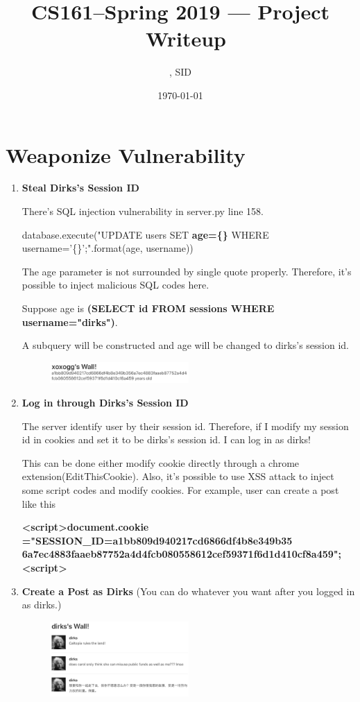 \documentclass[11pt]{article}
\title{CS161--Spring 2019 --- Project \Homework\ Writeup}
\author{\Name, SID \SID}
\date{\today}
\newenvironment{qparts}{\begin{enumerate}[{(}a{)}]}{\end{enumerate}}
\begin{document}
\maketitle

\section{Weaponize Vulnerability}
\begin{qparts}
	\item \textbf{Steal Dirks's Session ID}
	
	There's SQL injection vulnerability in server.py line 158.
	
	database.execute("UPDATE users SET \textbf{age=\{\}} WHERE username='\{\}';".format(age, username))

	The age parameter is not surrounded by single quote properly. Therefore, it's possible to inject malicious SQL codes here.
	
	Suppose age is \textbf{(SELECT id FROM sessions WHERE username="dirks")}.
	
	A subquery will be constructed and age will be changed to dirks's session id.
	
	\begin{figure}[h]
	\centering
	\includegraphics[width=0.5\textwidth]{session_id.png}
	\end{figure}
	
	\item \textbf{Log in through Dirks's Session ID}
	
	The server identify user by their session id. Therefore, if I modify my session id in cookies and set it to be dirks's session id. I can log in as dirks!
	
	This can be done either modify cookie directly through a chrome extension(EditThisCookie). Also, it's possible to use XSS attack to inject some script codes and modify cookies. For example, user can create a post like this 
	
	\textbf{\textless script\textgreater  document.cookie ="SESSION\_ID=a1bb809d940217cd6866df4b8e349b35 6a7ec4883faaeb87752a4d4fcb080558612cef59371f6d1d410cf8a459";\textless script\textgreater}
	
	\item \textbf{Create a Post as Dirks}
	(You can do whatever you want after you logged in as dirks.)
	\begin{figure}[h]
	\centering
	\includegraphics[width=0.5\textwidth]{post.png}
	\end{figure}
	
\end{qparts}
\end{document}
